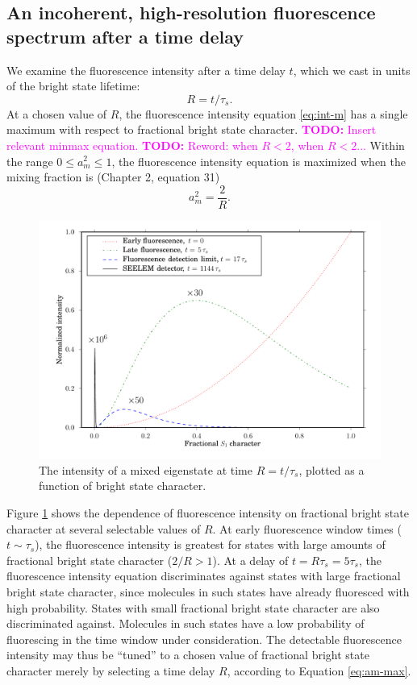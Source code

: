 \documentclass[12pt]{mitthesis}
\newcommand{\TODO} [1]{\textcolor{magenta}{\textbf{TODO:} #1}}
\begin{document}
\subsection{An incoherent, high-resolution fluorescence spectrum after
  a time delay}

We examine the fluorescence intensity after a time delay $t$,
which we cast in units of the bright state lifetime:
\begin{equation}
  R = t / \tau_s.
\end{equation}
At a chosen value of $R$, the fluorescence intensity equation
\ref{eq:int-m} has a single maximum with respect to fractional bright
state character.  \TODO{Insert relevant minmax equation.}
\TODO{Reword: when $R<2$, when $R<2$...} Within the range $0 \le a_m^2
\le 1$, the fluorescence intensity equation is maximized when the
mixing fraction is (Chapter 2, equation 31)
\begin{equation}
  \label{eq:am-max}
  a_m^2 = \frac{2}{R}.
\end{equation}

\begin{figure}
  \caption{The intensity of a mixed eigenstate at time $R =
    t/\tau_s$, plotted as a function of bright
    state character.}
  \label{fig:int-at-rc}
  \centering
  \includegraphics[width=7.5in,angle=90]{intensity-at-delay.pdf}
\end{figure}

Figure \ref{fig:int-at-rc} shows the dependence of fluorescence
intensity on fractional bright state character at several selectable
values of $R$.  At early fluorescence window times ($t \sim \tau_s$),
the fluorescence intensity is greatest for states with large amounts
of fractional bright state character ($2/R > 1$).  At a delay of $t =
R \tau_s = 5 \tau_s$, the fluorescence intensity equation
discriminates against states with large fractional bright state
character, since molecules in such states have already fluoresced with
high probability.  States with small fractional bright state character
are also discriminated against.  Molecules in such states have a low
probability of fluorescing in the time window under consideration.
The detectable fluorescence intensity may thus be ``tuned'' to a
chosen value of fractional bright state character merely by selecting
a time delay $R$, according to Equation \ref{eq:am-max}.
\end{document}
